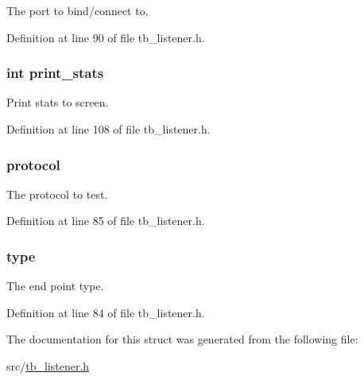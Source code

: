The port to bind/connect to. 



Definition at line 90 of file tb\-\_\-listener.\-h.

\hypertarget{structtb__test__params__t_a21a0be842e8fa2c780fa87f45bd5d17e}{
\subsubsection[{print\-\_\-stats}]{\setlength{\rightskip}{0pt plus 5cm}int print\-\_\-stats}}\label{structtb__test__params__t_a21a0be842e8fa2c780fa87f45bd5d17e}


Print stats to screen. 



Definition at line 108 of file tb\-\_\-listener.\-h.

\hypertarget{structtb__test__params__t_a0d2276cd987e688180eedab183cd503e}{
\subsubsection[{protocol}]{ protocol}}\label{structtb__test__params__t_a0d2276cd987e688180eedab183cd503e}


The protocol to test. 



Definition at line 85 of file tb\-\_\-listener.\-h.

\hypertarget{structtb__test__params__t_a3fefae1824d77098e05df5bac09c1791}{
\subsubsection[{type}]{ type}}\label{structtb__test__params__t_a3fefae1824d77098e05df5bac09c1791}


The end point type. 



Definition at line 84 of file tb\-\_\-listener.\-h.



The documentation for this struct was generated from the following file\-:\begin{DoxyCompactItemize}
\item 
src/\hyperlink{tb__listener_8h}{tb\-\_\-listener.\-h}\end{DoxyCompactItemize}
